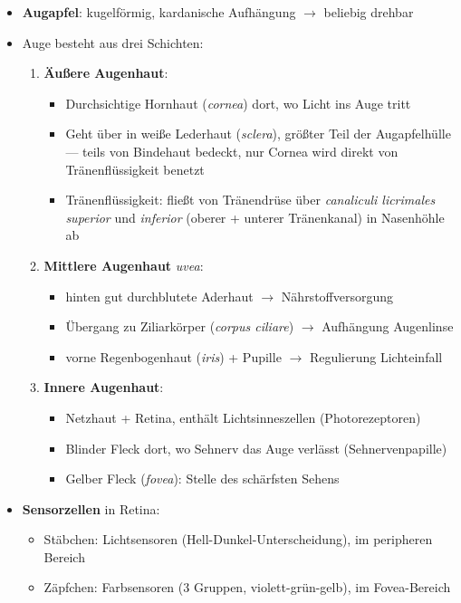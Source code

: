 \begin{itemize}
  \item \textbf{Augapfel}: kugelförmig, kardanische Aufhängung \( \to \) beliebig drehbar
  \item Auge besteht aus drei Schichten:
  \begin{enumerate}
    \item \textbf{Äußere Augenhaut}:
    \begin{itemize}
      \item Durchsichtige Hornhaut (\emph{cornea}) dort, wo Licht ins Auge tritt
      \item Geht über in weiße Lederhaut (\emph{sclera}), größter Teil der Augapfelhülle --- teils von Bindehaut bedeckt, nur Cornea wird direkt von Tränenflüssigkeit benetzt
      \item Tränenflüssigkeit: fließt von Tränendrüse über \emph{canaliculi licrimales superior} und \emph{inferior} (oberer + unterer Tränenkanal) in Nasenhöhle ab
    \end{itemize}
    \item \textbf{Mittlere Augenhaut} \emph{uvea}:
    \begin{itemize}
      \item hinten gut durchblutete Aderhaut \( \to \) Nährstoffversorgung
      \item Übergang zu Ziliarkörper (\emph{corpus ciliare}) \( \to \) Aufhängung Augenlinse
      \item vorne Regenbogenhaut (\emph{iris}) + Pupille \( \to \) Regulierung Lichteinfall
    \end{itemize}
    \item \textbf{Innere Augenhaut}:
    \begin{itemize}
      \item Netzhaut + Retina, enthält Lichtsinneszellen (Photorezeptoren)
      \item Blinder Fleck dort, wo Sehnerv das Auge verlässt (Sehnervenpapille)
      \item Gelber Fleck (\emph{fovea}): Stelle des schärfsten Sehens
    \end{itemize}
  \end{enumerate}
  \item \textbf{Sensorzellen} in Retina:
  \begin{itemize}
    \item Stäbchen: Lichtsensoren (Hell-Dunkel-Unterscheidung), im peripheren Bereich
    \item Zäpfchen: Farbsensoren (3 Gruppen, violett-grün-gelb), im Fovea-Bereich
  \end{itemize}
\end{itemize}


